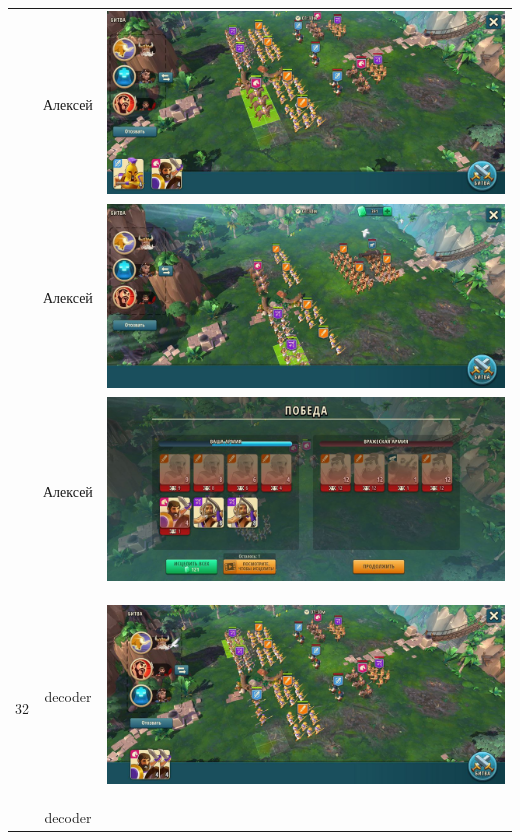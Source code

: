 \begin{longtable}{|c|c|c|}
	& Алексей &
	\includegraphics[width=0.75\linewidth]{./parts/media/TreasureHunt/32/alexey/photo_2022-04-14_13-54-23.jpg} \\
	& Алексей &
	\includegraphics[width=0.75\linewidth]{./parts/media/TreasureHunt/32/alexey/photo_2022-04-14_13-54-53.jpg} \\
	& Алексей &
	\includegraphics[width=0.75\linewidth]{./parts/media/TreasureHunt/32/alexey/photo_2022-04-14_13-54-58.jpg} \\
	\hline
	\multirow{12}{*}{32} & decoder &
	\hypertarget{fight32}{\includegraphics[width=0.75\linewidth]{./parts/media/TreasureHunt/32/decoder/photo_2022-04-07_10-00-59.jpg}} \\
	& decoder &

\end{longtable}
